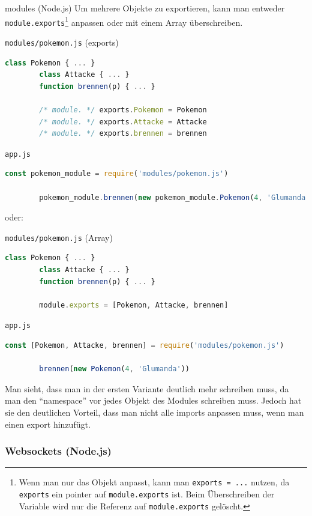 \begin{example}{modules (Node.js)}
    Um mehrere Objekte zu exportieren, kann man entweder \texttt{module.exports}\footnote{
        Wenn man nur das Objekt anpasst, kann man \texttt{exports = ...} nutzen, da \texttt{exports} ein pointer auf \texttt{module.exports} ist.
        Beim Überschreiben der Variable wird nur die Referenz auf \texttt{module.exports} gelöscht.
    } anpassen oder mit einem Array überschreiben.

    \texttt{modules/pokemon.js} (exports)
    \begin{lstlisting}[language=JavaScript]
        class Pokemon { ... }
        class Attacke { ... }
        function brennen(p) { ... }

        /* module. */ exports.Pokemon = Pokemon
        /* module. */ exports.Attacke = Attacke
        /* module. */ exports.brennen = brennen
    \end{lstlisting}

    \texttt{app.js}
    \begin{lstlisting}[language=JavaScript]
        const pokemon_module = require('modules/pokemon.js')

        pokemon_module.brennen(new pokemon_module.Pokemon(4, 'Glumanda'))
    \end{lstlisting}

    oder:

    \texttt{modules/pokemon.js} (Array)
    \begin{lstlisting}[language=JavaScript]
        class Pokemon { ... }
        class Attacke { ... }
        function brennen(p) { ... }

        module.exports = [Pokemon, Attacke, brennen]
    \end{lstlisting}

    \texttt{app.js}
    \begin{lstlisting}[language=JavaScript]
        const [Pokemon, Attacke, brennen] = require('modules/pokemon.js')

        brennen(new Pokemon(4, 'Glumanda'))
    \end{lstlisting}

    Man sieht, dass man in der ersten Variante deutlich mehr schreiben muss, da man den \enquote{namespace} vor jedes Objekt des Modules schreiben muss.
    Jedoch hat sie den deutlichen Vorteil, dass man nicht alle imports anpassen muss, wenn man einen export hinzufügt.
\end{example}

\subsubsection{Websockets (Node.js)}

